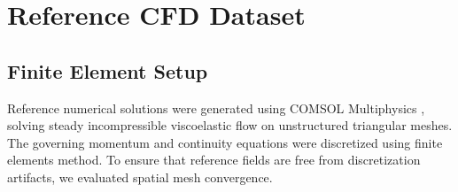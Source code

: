 \begin{table}[htbp]
    \centering
    \caption{Classification of physical fields and parameters across direct and
    inverse problem formulations.}
    \label{tab:variable_roles}
\end{table}

\section{Reference CFD Dataset}
\label{sec:reference_cfd_dataset}

\subsection{Finite Element Setup}
\label{subsec:finite_element_setup}

Reference numerical solutions were generated using COMSOL Multiphysics
\cite{comsol_multiphysics}, solving steady incompressible viscoelastic flow on
unstructured triangular meshes. The governing momentum and continuity equations
were discretized using finite elements method.
To ensure that reference fields are free from discretization artifacts,
we evaluated spatial mesh convergence.

